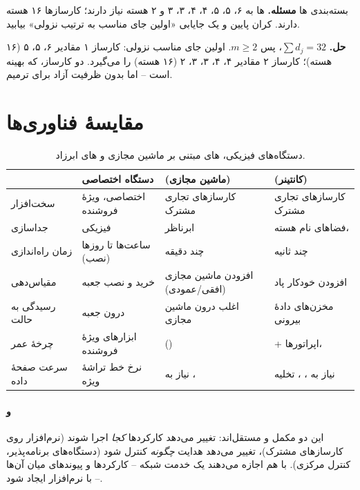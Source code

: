 \documentclass[11pt,a4paper]{article}
\begin{document}
\begin{examplebox}{بسته‌بندی ها}\label{ex:pack}
\textbf{مسئله.} ها به ۶، ۵، ۵، ۴، ۴، ۳، ۳ و ۲ هسته نیاز دارند؛ کارسازها ۱۶ هسته دارند. کران پایین و یک جایابی «اولین
جای مناسب به ترتیب نزولی» بیابید.

\textbf{حل.} $\sum d_j = 32$، پس $m \ge 2$. اولین جای مناسب نزولی: کارساز ۱ مقادیر ۶، ۵، ۵ (۱۶ هسته)؛ کارساز ۲ مقادیر ۴، ۴، ۳، ۳،
۲ (۱۶ هسته) را می‌گیرد. دو کارساز، که بهینه است -- اما بدون ظرفیت آزاد برای ترمیم.
\end{examplebox}

\section{مقایسهٔ فناوری‌ها}
\begin{table}[htbp]
\centering\small
\caption{دستگاه‌های فیزیکی، های مبتنی بر ماشین مجازی و های ابرزاد.}\label{tab:cmp}
\begin{tabularx}{\linewidth}{@{}l Y Y Y@{}}
\toprule
{} & دستگاه اختصاصی &  (ماشین مجازی) &  (کانتینر) \\
\midrule
سخت‌افزار        & اختصاصی، ویژهٔ فروشنده   & کارسازهای تجاری مشترک & کارسازهای تجاری مشترک \\
جداسازی          & فیزیکی                    & ابرناظر               & فضاهای نام هسته،  \\
زمان راه‌اندازی   & ساعت‌ها تا روزها (نصب)   & چند دقیقه             & چند ثانیه \\
مقیاس‌دهی        & خرید و نصب جعبه           & افزودن ماشین مجازی (افقی/عمودی) & افزودن خودکار پاد \\
رسیدگی به حالت   & درون جعبه                 & اغلب درون ماشین مجازی  & مخزن‌های دادهٔ بیرونی \\
چرخهٔ عمر        & ابزارهای ویژهٔ فروشنده    &  () &  + اپراتورها،  \\
سرعت صفحهٔ داده  & نرخ خط تراشهٔ ویژه        & نیاز به ،  & نیاز به ، ، تخلیه \\
\bottomrule
\end{tabularx}
\end{table}

\paragraph{ و } این دو مکمل و مستقل‌اند:  تغییر می‌دهد کارکردها \emph{کجا} اجرا شوند (نرم‌افزار روی
کارسازهای مشترک)،  تغییر می‌دهد هدایت \emph{چگونه} کنترل شود (دستگاه‌های برنامه‌پذیر، کنترل مرکزی). با هم اجازه
می‌دهند یک خدمت شبکه -- کارکردها و پیوندهای میان آن‌ها -- با نرم‌افزار ایجاد شود.
\end{document}
